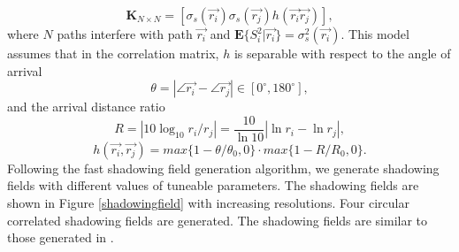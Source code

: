 \begin{equation}
\mathbf{K}_{N\times N} = [ \sigma_{s}(\vec{r_{i}})\sigma_{s}(\vec{r_{j}})h(\vec{r_{i}}\vec{r_{j}})],
\label{correlationmatrix}
\end{equation}
where $N$ paths interfere with path $\vec{r_{i}}$ and $\mathbf{E}\{S_{i}^{2}|\vec{r_{i}}\}=\sigma_{s}^{2}(\vec{r_{i}})$. This model assumes that in the correlation matrix, $h$ is separable with respect to the angle of arrival
\begin{equation}
\theta = |\angle\vec{r_{i}}-\angle\vec{r_{j}}|\in [0^{\circ},180^{\circ}],
\end{equation}
and the arrival distance ratio
\begin{equation}
R=|10\log_{10}r_{i}/r_{j}|=\frac{10}{\ln 10}|\ln r_{i}-\ln r_{j}|,
\end{equation}
\begin{equation}
h(\vec{r_{i}},\vec{r_{j}})=max\{1-\theta/\theta_{0},0\}\cdot max\{1-R/R_{0},0\}.
\end{equation}
Following the fast shadowing field generation algorithm, we generate shadowing fields with different values of tuneable parameters. The shadowing fields are shown in Figure \ref{shadowingfield} with increasing resolutions. Four circular correlated shadowing fields are generated.
The shadowing fields are similar to those generated in \cite{szyszkowicz2011interference}.
